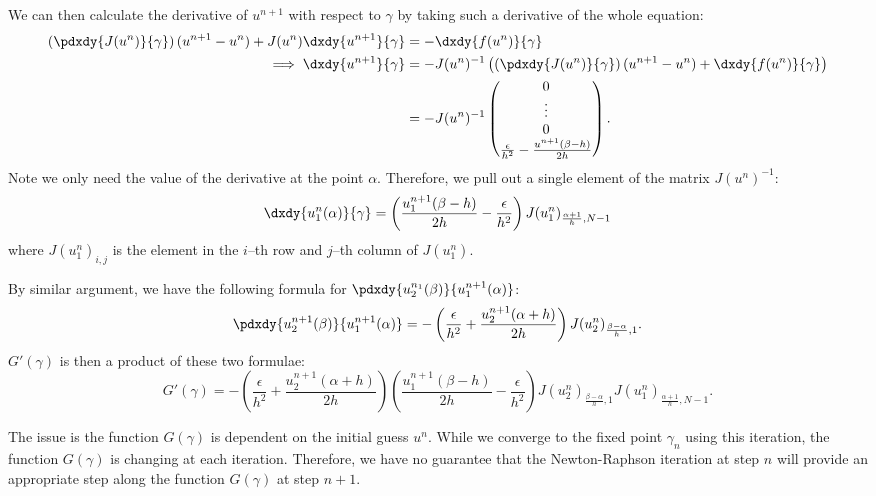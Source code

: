 \documentclass{book}
\begin{document}
We can then calculate the derivative of $u^{n+1}$ with respect to $\gamma$ by taking such a derivative of the whole equation:
\begin{align*}
\left ( \pdxdy{J(u^n)}{\gamma} \right ) (u^{n+1} - u^n) + J(u^n) \dxdy{u^{n+1}}{\gamma} & = - \dxdy{f(u^n)}{\gamma} \\
\implies \dxdy{u^{n+1}}{\gamma} & = -J(u^n)^{-1} \left ( \left ( \pdxdy{J(u^n)}{\gamma} \right ) (u^{n+1} - u^n) + \dxdy{f(u^n)}{\gamma} \right ) \\
& = -J(u^n)^{-1} \begin{pmatrix} 0 \\ \vdots \\ 0 \\ \frac{\epsilon}{h^2} - \frac{u^{n+1}(\beta-h)}{2h} \end{pmatrix} .
\end{align*}
Note we only need the value of the derivative at the point $\alpha$.
Therefore, we pull out a single element of the matrix $J(u^n)^{-1}$:
\begin{equation*}
\dxdy{u^n_1(\alpha)}{\gamma} = \left ( \frac{u^{n+1}_1(\beta-h)}{2h} - \frac{\epsilon}{h^2} \right ) J(u^n_1)_{\frac{\alpha+1}{h},N-1}
\end{equation*}
where $J(u^n_1)_{i,j}$ is the element in the $i$--th row and $j$--th column of $J(u^n_1)$.

By similar argument, we have the following formula for $\pdxdy{u^{n_1}_2(\beta)}{u^{n+1}_1(\alpha)}$:
\begin{equation*}
\pdxdy{u^{n+1}_2(\beta)}{u^{n+1}_1(\alpha)} = -\left(\frac{\epsilon}{h^2} + \frac{u^{n+1}_2(\alpha+h)}{2h} \right) J(u^n_2)_{\frac{\beta-\alpha}{h}, 1} .
\end{equation*}
$G'(\gamma)$ is then a product of these two formulae:
\begin{equation*}
G'(\gamma) = -\left(\frac{\epsilon}{h^2} + \frac{u^{n+1}_2(\alpha+h)}{2h} \right) \left ( \frac{u^{n+1}_1(\beta-h)}{2h} - \frac{\epsilon}{h^2} \right ) J(u^n_2)_{\frac{\beta-\alpha}{h}, 1} J(u^n_1)_{\frac{\alpha+1}{h},N-1} .
\end{equation*}

The issue is the function $G(\gamma)$ is dependent on the initial guess $u^n$.
While we converge to the fixed point $\gamma_n$ using this iteration, the function $G(\gamma)$ is changing at each iteration.
Therefore, we have no guarantee that the Newton-Raphson iteration at step $n$ will provide an appropriate step along the function $G(\gamma)$ at step $n+1$.
\end{document}
